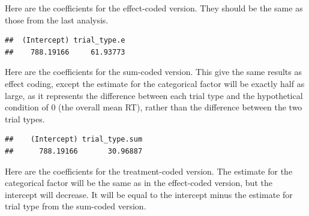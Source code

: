 \documentclass[
  oneside]{book}
\newenvironment{Shaded}{\begin{snugshade}}{\end{snugshade}}
\newcommand{\AttributeTok}[1]{\textcolor[rgb]{0.77,0.63,0.00}{#1}}
\newcommand{\FunctionTok}[1]{\textcolor[rgb]{0.00,0.00,0.00}{#1}}
\newcommand{\NormalTok}[1]{#1}
\newcommand{\SpecialCharTok}[1]{\textcolor[rgb]{0.00,0.00,0.00}{#1}}
\begin{document}
Here are the coefficients for the effect-coded version. They should be the same as those from the last analysis.

\begin{Shaded}
\end{Shaded}

\begin{verbatim}
##  (Intercept) trial_type.e 
##    788.19166     61.93773
\end{verbatim}

Here are the coefficients for the sum-coded version. This give the same results as effect coding, except the estimate for the categorical factor will be exactly half as large, as it represents the difference between each trial type and the hypothetical condition of 0 (the overall mean RT), rather than the difference between the two trial types.

\begin{Shaded}
\end{Shaded}

\begin{verbatim}
##    (Intercept) trial_type.sum 
##      788.19166       30.96887
\end{verbatim}

Here are the coefficients for the treatment-coded version. The estimate for the categorical factor will be the same as in the effect-coded version, but the intercept will decrease. It will be equal to the intercept minus the estimate for trial type from the sum-coded version.

\begin{Shaded}
\end{Shaded}
\end{document}
